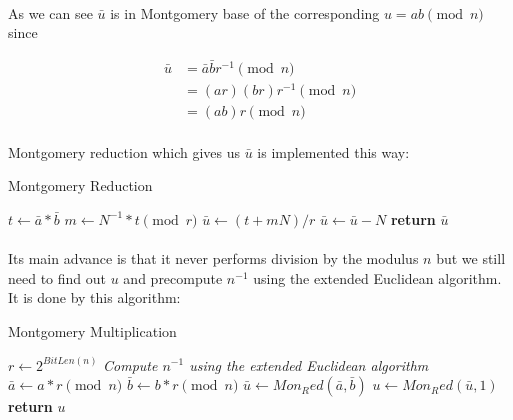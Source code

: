 \documentclass[thesis=B,english]{FITthesis}[2012/10/20]
\begin{document}
{\paragraph*{}{
As we can see \(\bar{u}\) is in Montgomery base of the corresponding 
\(u = ab \pmod{n}\) 
since}

\begin{equation}
\begin{split}
\bar{u} & = \bar{a}\bar{b}r^{-1} \pmod{n} \\
 & = (ar)(br)r^{-1} \pmod{n} \\
 & = (ab)r \pmod{n}
\end{split}
\end{equation}
\medskip

\paragraph*{}{
Montgomery reduction which gives us \(\bar{u}\) is implemented this way:
}

\begin{algorithm}[H]
\caption{Montgomery Reduction}
\begin{algorithmic}[1]
 \State $t \gets\bar{a} *\bar{b}$
 \State $m \gets N^{-1} * t \pmod{r}$
 \State $\bar{u} \gets (t + mN) / r$
  \State $\bar{u} \gets\bar{u} - N$
 \EndIf
\State \textbf{return} $\bar{u}$
\EndFunction
\end{algorithmic}
\end{algorithm}

\paragraph*{}
{
Its main advance is that it never performs division by the modulus \(n\) but we still need to find out \(u\) and precompute \(n^{-1}\) using the extended Euclidean algorithm.
It is done by this algorithm: }

\begin{algorithm}[H]
\caption{Montgomery Multiplication}
\begin{algorithmic}[1]
 \State $r \gets 2^{BitLen(n)}$
 \State \textit{Compute \(n^{-1}\) using the extended Euclidean algorithm}
 \State $\bar{a} \gets a *r \pmod{n}$
 \State $\bar{b} \gets b * r \pmod{n}$
 \State $\bar{u} \gets Mon_Red(\bar{a}, \bar{b})$
 \State $u \gets Mon_Red(\bar{u}, 1)$
 \State \textbf{return} $u$
\EndFunction
\end{algorithmic}
\end{algorithm}


}
\end{document}
